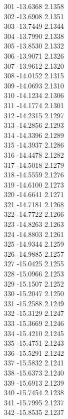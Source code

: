 \documentclass[11pt]{article}
\theoremstyle{definition}
\theoremstyle{plain}
\begin{document}
{301 -13.6368 2.1358\\
302 -13.6908 2.1351\\
303 -13.7449 2.1344\\
304 -13.7990 2.1338\\
305 -13.8530 2.1332\\
306 -13.9071 2.1326\\
307 -13.9612 2.1320\\
308 -14.0152 2.1315\\
309 -14.0693 2.1310\\
310 -14.1234 2.1306\\
311 -14.1774 2.1301\\
312 -14.2315 2.1297\\
313 -14.2856 2.1293\\
314 -14.3396 2.1289\\
315 -14.3937 2.1286\\
316 -14.4478 2.1282\\
317 -14.5018 2.1279\\
318 -14.5559 2.1276\\
319 -14.6100 2.1273\\
320 -14.6641 2.1271\\
321 -14.7181 2.1268\\
322 -14.7722 2.1266\\
323 -14.8263 2.1263\\
324 -14.8803 2.1261\\
325 -14.9344 2.1259\\
326 -14.9885 2.1257\\
327 -15.0425 2.1255\\
328 -15.0966 2.1253\\
329 -15.1507 2.1252\\
330 -15.2047 2.1250\\
331 -15.2588 2.1249\\
332 -15.3129 2.1247\\
333 -15.3669 2.1246\\
334 -15.4210 2.1245\\
335 -15.4751 2.1243\\
336 -15.5291 2.1242\\
337 -15.5832 2.1241\\
338 -15.6373 2.1240\\
339 -15.6913 2.1239\\
340 -15.7454 2.1238\\
341 -15.7995 2.1237\\
342 -15.8535 2.1237\\
}
\end{document}
